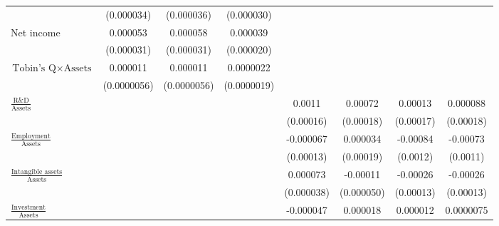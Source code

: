 {\begin{tabular}{l*{7}{c}}
                    &  (0.000034)         &  (0.000036)         &  (0.000030)         &                     &                     &                     &                     \\
\addlinespace
Net income          &    0.000053\sym{*}  &    0.000058\sym{*}  &    0.000039\sym{*}  &                     &                     &                     &                     \\
                    &  (0.000031)         &  (0.000031)         &  (0.000020)         &                     &                     &                     &                     \\
\addlinespace
$\textrm{Tobin's Q} \times \textrm{Assets}$&    0.000011\sym{*}  &    0.000011\sym{*}  &   0.0000022         &                     &                     &                     &                     \\
                    & (0.0000056)         & (0.0000056)         & (0.0000019)         &                     &                     &                     &                     \\
\addlinespace
$\frac{\textrm{R\&D}}{\textrm{Assets}}$&                     &                     &                     &      0.0011\sym{***}&     0.00072\sym{***}&     0.00013         &    0.000088         \\
                    &                     &                     &                     &   (0.00016)         &   (0.00018)         &   (0.00017)         &   (0.00018)         \\
\addlinespace
$\frac{\textrm{Employment}}{\textrm{Assets}}$&                     &                     &                     &   -0.000067         &    0.000034         &    -0.00084         &    -0.00073         \\
                    &                     &                     &                     &   (0.00013)         &   (0.00019)         &    (0.0012)         &    (0.0011)         \\
\addlinespace
$\frac{\textrm{Intangible assets}}{\textrm{Assets}}$&                     &                     &                     &    0.000073\sym{*}  &    -0.00011\sym{**} &    -0.00026\sym{**} &    -0.00026\sym{**} \\
                    &                     &                     &                     &  (0.000038)         &  (0.000050)         &   (0.00013)         &   (0.00013)         \\
\addlinespace
$\frac{\textrm{Investment}}{\textrm{Assets}}$&                     &                     &                     &   -0.000047         &    0.000018         &    0.000012         &   0.0000075         \\

\end{tabular}}
